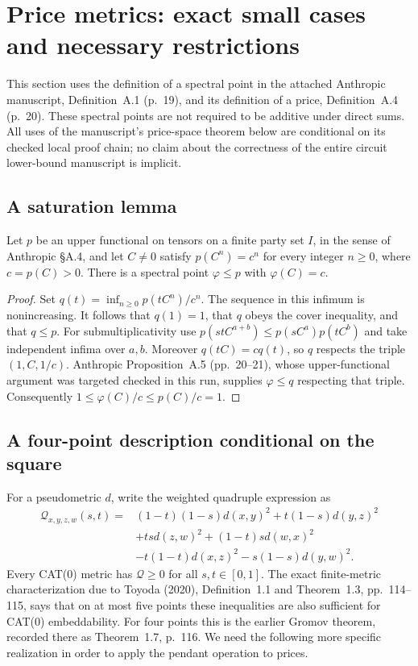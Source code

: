 \section{Price metrics: exact small cases and necessary restrictions}
\label{sec:price-geometry}

This section uses the definition of a spectral point in the attached Anthropic
manuscript, Definition~A.1 (p.~19), and its definition of a price,
Definition~A.4 (p.~20). These spectral points are not required to be additive
under direct sums. All uses of the manuscript's price-space theorem below are
conditional on its checked local proof chain; no claim about the correctness of
the entire circuit lower-bound manuscript is implicit.

\subsection{A saturation lemma}

\begin{lemma}
\label{pg:saturation}
Let $p$ be an upper functional on tensors on a finite party set $I$, in the
sense of Anthropic \S A.4, and let $C\ne0$ satisfy
$p(C^n)=c^n$ for every integer $n\geq0$, where $c=p(C)>0$.
There is a spectral point $\varphi\leq p$ with $\varphi(C)=c$.
\end{lemma}
\begin{proof}
Set $q(t)=\inf_{n\geq0}p(tC^n)/c^n$. The sequence in this infimum is
nonincreasing. It follows that $q(1)=1$, that $q$ obeys the cover inequality,
and that $q\leq p$. For submultiplicativity use
$p(stC^{a+b})\leq p(sC^a)p(tC^b)$ and take independent infima over
$a,b$. Moreover $q(tC)=c q(t)$, so $q$ respects the triple $(1,C,1/c)$.
Anthropic Proposition~A.5 (pp.~20--21), whose upper-functional argument was
targeted checked in this run, supplies $\varphi\leq q$ respecting that triple.
Consequently $1\leq\varphi(C)/c\leq p(C)/c=1$.
\end{proof}

\subsection{A four-point description conditional on the square}

For a pseudometric $d$, write the weighted quadruple expression as
\begin{align}
 \mathcal Q_{x,y,z,w}(s,t)={}&
 (1-t)(1-s)d(x,y)^2+t(1-s)d(y,z)^2\nonumber\\
 &+tsd(z,w)^2+(1-t)s d(w,x)^2\nonumber\\
 &-t(1-t)d(x,z)^2-s(1-s)d(y,w)^2.
 \label{pg:weighted-quad}
\end{align}
Every CAT(0) metric has $\mathcal Q\geq0$ for all $s,t\in[0,1]$.
The exact finite-metric characterization due to Toyoda (2020),
Definition~1.1 and Theorem~1.3, pp.~114--115, says that on at most
five points these inequalities are also sufficient for CAT(0)
embeddability. For four points this is the earlier Gromov theorem,
recorded there as Theorem~1.7, p.~116. We need the following more
specific realization in order to apply the pendant operation to prices.

